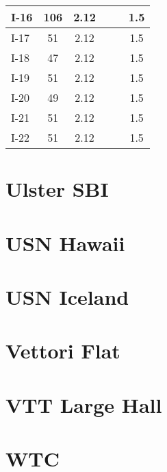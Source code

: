\begin{table}[!h]
\begin{center}
\begin{tabular}{|l|c|c||l|c|c|}
I-16       &  106              &  2.12      &            &                   &  1.5       \\ \hline
I-17       &  51               &  2.12      &            &                   &  1.5       \\ \hline
I-18       &  47               &  2.12      &            &                   &  1.5       \\ \hline
I-19       &  51               &  2.12      &            &                   &  1.5       \\ \hline
I-20       &  49               &  2.12      &            &                   &  1.5       \\ \hline
I-21       &  51               &  2.12      &            &                   &  1.5       \\ \hline
I-22       &  51               &  2.12      &            &                   &  1.5       \\ \hline
\end{tabular}
\end{center}
\end{table}


\clearpage


\section{Ulster SBI}


\clearpage


\section{USN Hawaii}


\clearpage


\section{USN Iceland}


\clearpage


\section{Vettori Flat}


\clearpage


\section{VTT Large Hall}


\clearpage


\section{WTC}

